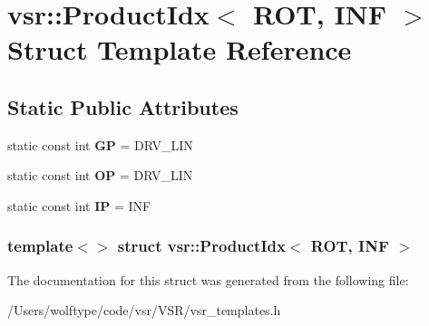 \hypertarget{structvsr_1_1_product_idx_3_01_r_o_t_00_01_i_n_f_01_4}{\section{vsr\-:\-:Product\-Idx$<$ R\-O\-T, I\-N\-F $>$ Struct Template Reference}
\label{structvsr_1_1_product_idx_3_01_r_o_t_00_01_i_n_f_01_4}
}
\subsection*{Static Public Attributes}
\begin{DoxyCompactItemize}
\item 
\hypertarget{structvsr_1_1_product_idx_3_01_r_o_t_00_01_i_n_f_01_4_af26480fdff057b61a79451cd66523a70}{static const int {\bfseries G\-P} = D\-R\-V\-\_\-\-L\-I\-N}\label{structvsr_1_1_product_idx_3_01_r_o_t_00_01_i_n_f_01_4_af26480fdff057b61a79451cd66523a70}

\item 
\hypertarget{structvsr_1_1_product_idx_3_01_r_o_t_00_01_i_n_f_01_4_a3b7766da0a84e6507f34e44a58c677c0}{static const int {\bfseries O\-P} = D\-R\-V\-\_\-\-L\-I\-N}\label{structvsr_1_1_product_idx_3_01_r_o_t_00_01_i_n_f_01_4_a3b7766da0a84e6507f34e44a58c677c0}

\item 
\hypertarget{structvsr_1_1_product_idx_3_01_r_o_t_00_01_i_n_f_01_4_ab23e1d1b1440856e3733b38fc849037b}{static const int {\bfseries I\-P} = I\-N\-F}\label{structvsr_1_1_product_idx_3_01_r_o_t_00_01_i_n_f_01_4_ab23e1d1b1440856e3733b38fc849037b}

\end{DoxyCompactItemize}
\subsubsection*{template$<$$>$ struct vsr\-::\-Product\-Idx$<$ R\-O\-T, I\-N\-F $>$}



The documentation for this struct was generated from the following file\-:\begin{DoxyCompactItemize}
\item 
/\-Users/wolftype/code/vsr/\-V\-S\-R/vsr\-\_\-templates.\-h\end{DoxyCompactItemize}
